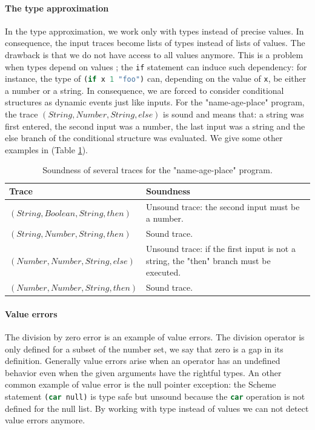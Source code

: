 \documentclass[a4paper]{report}
\newcommand{\ischeme}[1]{\colorbox{white}{\lstinline[language=scheme]&#1&}} %
\newcommand{\icode}[1]{\colorbox{white}{\lstinline[language=code]&#1&}} %
\newcommand{\reftab}[1]{(Table \ref{#1})}
\begin{document}
\paragraph{The type approximation} In the type approximation, we work only with types instead of precise values. In consequence, the input traces become lists of types instead of lists of values. The drawback is that we do not have access to all values anymore. This is a problem when types depend on values ; the \icode{if} statement can induce such dependency: for instance, the type of \ischeme{(if x 1 "foo")} can, depending on the value of \ischeme{x}, be either a number or a string. In consequence, we are forced to consider conditional structures as dynamic events just like inputs. For the "name-age-place" program, the trace $(String,Number,String,else)$ is sound and means that: a string was first entered, the second input was a number, the last input was a string and the else branch of the conditional structure was evaluated. We give some other examples in \reftab{approx_trace}.

\begin{table}
\centering
\begin{tabular}{|l|p{5cm}|}
\hline
Trace & Soundness \\
\hline
$(String,Boolean,String,then)$ & Unsound trace: the second input must be a number.\\
\hline
$(String,Number,String,then)$ & Sound trace.\\
\hline
$(Number,Number,String,else)$ & Unsound trace: if the first input is not a string, the "then" branch must be executed.\\
\hline
$(Number,Number,String,then)$ & Sound trace.\\
\hline
\end{tabular}
\caption{Soundness of several traces for the "name-age-place" program.}
\label{approx_trace}
\end{table}

\paragraph{Value errors} The division by zero error is an example of value errors. The division operator is only defined for a subset of the number set, we say that zero is a gap in its definition. Generally value errors arise when an operator has an undefined behavior even when the given arguments have the rightful types. An other common example of value error is the null pointer exception: the Scheme statement \ischeme{(car null)} is type safe but unsound because the \ischeme{car} operation is not defined for the null list. By working with type instead of values we can not detect value errors anymore.
\end{document}
